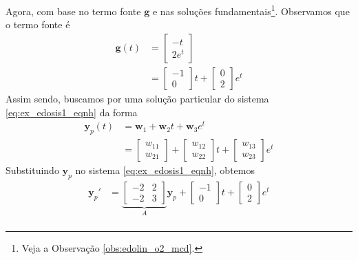 \begin{ex}
Agora, com base no termo fonte $\pmb{g}$ e nas soluções fundamentais\footnote{Veja a Observação \ref{obs:edolin_o2_mcd}.}. Observamos que o termo fonte é
\begin{align}
  \pmb{g}(t) &=
  \begin{bmatrix}
    -t\\
    2e^t
  \end{bmatrix}\\
  &=
  \begin{bmatrix}
    -1\\0
  \end{bmatrix}t+
  \begin{bmatrix}
    0\\
    2
  \end{bmatrix}e^t
\end{align}
Assim sendo, buscamos por uma solução particular do sistema \eqref{eq:ex_edosis1_eqnh} da forma
\begin{align}
  \pmb{y}_p(t) &= \pmb{w}_1 + \pmb{w}_2t + \pmb{w}_3e^{t} \\
               &=
                 \begin{bmatrix}
                   w_{11} \\
                   w_{21}
                 \end{bmatrix} +
  \begin{bmatrix}
    w_{12} \\
    w_{22}
  \end{bmatrix}t +
  \begin{bmatrix}
    w_{13} \\
    w_{23}
  \end{bmatrix}e^{t}
\end{align}
Substituindo $\pmb{y}_p$ no sistema \eqref{eq:ex_edosis1_eqnh}, obtemos
\begin{align}
  \pmb{y}_p' &=
               \underbrace{\begin{bmatrix}
                 -2 & 2 \\
                 -2 & 3
               \end{bmatrix}}_{A}\pmb{y}_p +
                      \begin{bmatrix}
                        -1\\
                        0
                      \end{bmatrix}t +
  \begin{bmatrix}
    0 \\
    2
  \end{bmatrix}e^{t} \\

\end{align}
\end{ex}

